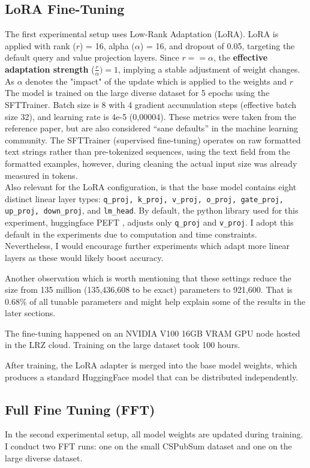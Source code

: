 \documentclass[12pt,conference]{IEEEtran}
\begin{document}
\subsection{LoRA Fine-Tuning}
The first experimental setup uses Low-Rank Adaptation (LoRA). LoRA is applied with rank ($r$) = 16, alpha ($\alpha$) = 16, and dropout of 0.05, targeting the default query and value projection layers. Since $r==\alpha$, the \textbf{effective adaptation strength} ($\frac{r}{\alpha}) = 1$, implying a stable adjustment of weight changes. As $\alpha$ denotes the "impact" of the update which is applied to the weights and $r$ The model is trained on the large diverse dataset for 5 epochs using the SFTTrainer. Batch size is 8 with 4 gradient accumulation steps (effective batch size 32), and learning rate is 4e-5 (0,00004). These metrics were taken from the reference paper, but are also considered “sane defaults” in the machine learning community. The SFTTrainer (supervised fine-tuning) operates on raw formatted text strings rather than pre-tokenized sequences, using the text field from the formatted examples, however, during cleaning the actual input size was already measured in tokens. \\

Also relevant for the LoRA configuration, is that the base model contains eight distinct linear layer types: \texttt{q\_proj, k\_proj, v\_proj, o\_proj, gate\_proj, up\_proj, down\_proj}, and \texttt{lm\_head}. By default, the python library used for this experiment, huggingface PEFT \cite{b9}, adjusts only \texttt{q\_proj} and \texttt{v\_proj}. I adopt this default in the experiments due to computation and time constraints. 
Nevertheless, I would encourage further experiments which adapt more linear layers as these would likely boost accuracy. 

Another observation which is worth mentioning that these settings reduce the size from 135 million (135,436,608 to be exact) parameters to 921,600. That is 0.68\% of all tunable parameters and might help explain some of the results in the later sections. 

The fine-tuning happened on an NVIDIA V100 16GB VRAM GPU node hosted in the LRZ cloud. Training on the large dataset took 100 hours.

After training, the LoRA adapter is merged into the base model weights, which produces a standard HuggingFace model that can be distributed independently.

\subsection{Full Fine Tuning (FFT)}
In the second experimental setup, all model weights are updated during training. I conduct two FFT runs: one on the small CSPubSum dataset and one on the large diverse dataset.
\end{document}
